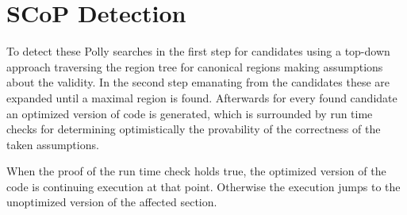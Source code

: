 \section{SCoP Detection}
To detect these \scops Polly searches in the first step for candidates using a top-down approach traversing the region tree for canonical regions making assumptions about the validity.
In the second step emanating from the candidates these are expanded until a maximal region is found.
Afterwards for every found candidate an optimized version of code is generated, which is surrounded by run time checks for determining optimistically the provability of the correctness of the taken assumptions.

When the proof of the run time check holds true, the optimized version of the code is continuing execution at that point.
Otherwise the execution jumps to the unoptimized version of the affected section.
